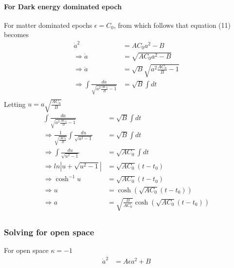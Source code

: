 \documentclass[a4paper, 11pt]{FSKH_623_Report}
\numberwithin{equation}{section}
\newcommand{\brac}[1]{\left(#1\right)}
\begin{document}
\paragraph*{For Dark energy dominated epoch}
For matter dominated epochs $\epsilon=C_{0}$, from which follows that equation (11) becomes
\begin{equation}
\begin{split}
\dot{a}^{2} &= AC_{0}a^{2}-B\\
\Rightarrow \dot{a} &= \sqrt{AC_{0}a^{2}-B}\\
\Rightarrow \dot{a} &= \sqrt{B}\sqrt{a^{2}\frac{AC_{0}}{B}-1}\\
\Rightarrow \int \frac{da}{\sqrt{a^{2}\frac{AC_{0}}{B}-1}} &= \sqrt{B}\int dt\\
\end{split}
\end{equation}
Letting $u=a\sqrt{\frac{AC_{0}}{B}}$
\begin{equation}
\begin{split}
\int \frac{da}{\sqrt{a^{2}\frac{AC_{0}}{B}-1}} &= \sqrt{B}\int dt\\
\Rightarrow \frac{1}{\sqrt{\frac{AC_{0}}{B}}}\int\frac{du}{\sqrt{u^{2}-1}} &= \sqrt{B}\int dt\\
\Rightarrow \int\frac{du}{\sqrt{u^{2}-1}} &= \sqrt{AC_{0}}\int dt\\
\Rightarrow ln\left|u+\sqrt{u^{2}-1}\right| &= \sqrt{AC_{0}}\brac{t-t_{0}}\\
\Rightarrow \cosh^{-1} u &= \sqrt{AC_{0}}\brac{t-t_{0}}\\
\Rightarrow u &= \cosh\brac{\sqrt{AC_{0}}\brac{t-t_{0}}}\\
\Rightarrow a &= \sqrt{\frac{B}{AC_{0}}}\cosh\brac{\sqrt{AC_{0}}\brac{t-t_{0}}}\\
\end{split}
\end{equation}
\pagebreak
\subsubsection*{Solving for open space}
For open space $\kappa=-1$
\begin{equation}
\begin{split}
\dot{a}^{2} &= A\epsilon a^{2}+B\\
\end{split}
\end{equation}
\end{document}
